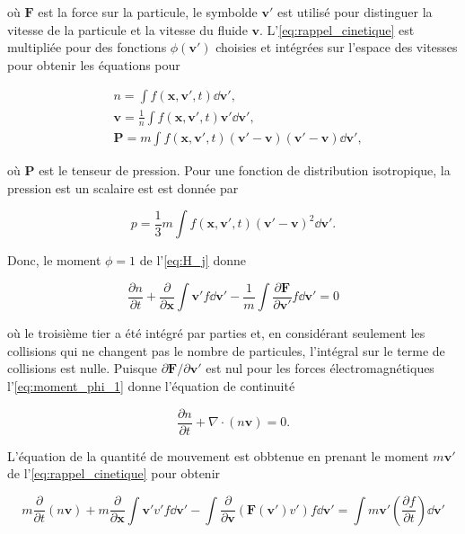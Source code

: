 \documentclass[main.tex]{subfiles}
\begin{document}
\noindent où \( \bm{F} \) est la force sur la particule, le symbolde \( \bm{v}' \) est utilisé pour distinguer la vitesse de la particule et la vitesse du fluide \( \bm{v} \).
L'\autoref{eq:rappel_cinetique} est multipliée pour des fonctions \( \phi\left(\bm{v}' \right) \) choisies et intégrées sur l'espace des vitesses pour obtenir les équations pour

\begin{align*}
	& n = \int f \left( \bm{x}, \bm{v}', t\right) \dd \bm{v}',\\
	& \bm{v} = \frac{1}{n} \int f \left( \bm{x}, \bm{v}', t\right)  \bm{v}' \dd \bm{v}',\\
	& \bm{P} = m \int f \left( \bm{x}, \bm{v}', t\right)  \left( \bm{v}' - \bm{v}\right) \left( \bm{v}' - \bm{v}\right) \dd \bm{v}',
\end{align*}

\noindent où \( \bm{P} \) est le tenseur de pression.
Pour une fonction de distribution isotropique, la pression est un scalaire est est donnée par

\[
	p = \frac{1}{3} m \int f \left( \bm{x}, \bm{v}', t\right) \left( \bm{v}' - \bm{v}\right)^2 \dd \bm{v}'.
\]

Donc, le moment \( \phi = 1 \) de l'\autoref{eq:H_j} donne

\begin{equation}
		\frac{\partial n}{\partial t} + \frac{\partial}{\partial \bm{x}} \int \bm{v}' f \dd \bm{v}' - \frac{1}{m} \int \frac{\partial \bm{F}}{\partial \bm{v}'} f \dd \bm{v}' = 0
		\label{eq:moment_phi_1}
\end{equation}

\noindent où le troisième tier a été intégré par parties et, en considérant seulement les collisions qui ne changent pas le nombre de particules, l'intégral sur le terme de collisions est nulle.
Puisque \( \partial \bm{F} / \partial \bm{v'} \) est nul pour les forces électromagnétiques l'\autoref{eq:moment_phi_1} donne l'équation de continuité

\begin{equation}
	\frac{\partial n}{\partial t} + \nabla \cdot \left( n \bm{v}\right) = 0.
	\label{eq:continuité_fluide}
\end{equation}

L'équation de la quantité de mouvement est obbtenue en prenant le moment \( m\bm{v}' \) de l'\autoref{eq:rappel_cinetique} pour obtenir

\begin{equation}
	m \frac{\partial}{\partial t} \left( n \bm{v}\right) + m \frac{\partial}{\partial \bm{x}} \int \bm{v}' v' f \dd \bm{v}' - \int \frac{\partial}{\partial \bm{v}} \left( \bm{F} \left( \bm{v}'\right) v'\right) f \dd \bm{v}' = \int m\bm{v}' \left( \frac{\partial f}{\partial t} \right) \dd \bm{v}'
	\label{eq:momentum_fluide}
\end{equation}
\end{document}
